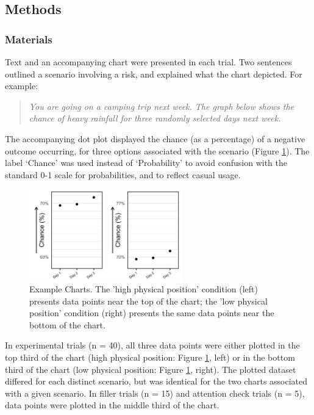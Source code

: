 \documentclass[journal]{vgtc}                %
\begin{document}
\hypertarget{methods}{%
\subsection{Methods}\label{methods}}

\hypertarget{materials}{%
\subsubsection{Materials}\label{materials}}

Text and an accompanying chart were presented in each trial. Two
sentences outlined a scenario involving a risk, and explained what the
chart depicted. For example:

\begin{quote}
\emph{You are going on a camping trip next week. The graph below shows the
chance of heavy rainfall for three randomly selected days next week.}
\end{quote}

The accompanying dot plot displayed the chance (as a percentage) of a
negative outcome occurring, for three options associated with the
scenario (Figure \ref{fig:example-charts}). The label `Chance' was used
instead of `Probability' to avoid confusion with the standard 0-1 scale
for probabilities, and to reflect casual usage.

\begin{figure}
\includegraphics[width=250px]{position_magnitude_files/figure-latex/example-charts-1} \caption{Example Charts. The 'high physical position' condition (left) presents data points near the top of the chart; the 'low physical position' condition (right) presents the same data points near the bottom of the chart.}\label{fig:example-charts}
\end{figure}

In experimental trials (n = 40), all three data points were either
plotted in the top third of the chart (high physical position: Figure
\ref{fig:example-charts}, left) or in the bottom third of the chart
(low physical position: Figure \ref{fig:example-charts}, right). The
plotted dataset differed for each distinct scenario, but was identical
for the two charts associated with a given scenario. In filler trials (n
= 15) and attention check trials (n = 5), data points were plotted in
the middle third of the chart.
\end{document}
